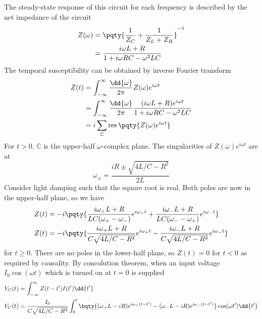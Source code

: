 \documentclass[12pt]{article}
\begin{document}
    \subsection{} The steady-state response of this circuit for each frequency is described by the net impedance of the circuit \begin{align*}
        Z(\omega) &=  \pqty{\frac{1}{Z_C} + \frac{1}{Z_L + Z_R}}^{-1}\\
        &=  \frac{i\omega L + R}{1 + i \omega RC - \omega^2 LC}
    \end{align*}
    The temporal susceptibility can be obtained by inverse Fourier transform \begin{align*}
        Z(t) &= \int_{ - \infty}^{\infty} \frac{\dd{\omega}}{2\pi} Z(\omega) e^{i\omega t}\\
        &= \int_{ - \infty}^{\infty} \frac{\dd{\omega}}{2\pi}  \frac{(i\omega L + R)e^{i\omega t}}{1 + i \omega RC -\omega^2 LC} \\
        &= i\sum_{\mathbb{C}} \operatorname{res}\pqty{Z(\omega)e^{i\omega t}}
    \end{align*}
    For \(t > 0\), \(\mathbb{C}\) is the upper-half \(\omega\)-complex plane. The singularities of \(Z(\omega) e^{i\omega t }\) are at \[
        \omega_{\pm} = \frac{iR\pm \sqrt{4L /C  - R^2}}{2L} 
    \]
    Consider light damping such that the square root is real. Both poles are now in the upper-half plane, so we have \begin{align*}
        Z(t) &= -i \pqty{\frac{i\omega_ +L+ R}{LC( \omega_ + - \omega_ -)}  e^{i\omega_ + t} + \frac{i\omega_ - L+ R}{LC( \omega_ - - \omega_ +)}  e^{i\omega_ - t} }\\
        Z(t) &= -i \pqty{\frac{i\omega_ + L+ R}{C \sqrt{4L /C - R^2}}  e^{i\omega_ + t} - \frac{i\omega_ -L+ R}{C \sqrt{4L /C - R^2}}  e^{i\omega_ - t} }
    \end{align*}
    for \(t \geq 0\). There are no poles in the lower-half plane, so \(Z(t) = 0\) for \(t < 0\) as required by causality. By concolution theorem, when an input voltage \(I_0 \cos(\omega t)\) which is turned on at \(t = 0\) is supplied
    \begin{align*}
        V_C(t) &= \int_{ -\infty}^{\infty} Z(t - t') I(t') \dd{t'}\\
        V_C(t) &= \frac{I_0}{C \sqrt{4L /C - R^2}}\int_0^t  \bqty{(\omega_ + L - i R)  e^{i\omega_ + (t - t')} -( \omega_ -L - i R)  e^{i\omega_ - (t- t')} }\cos(\omega t') \dd{t'}
    \end{align*}
\end{document}
